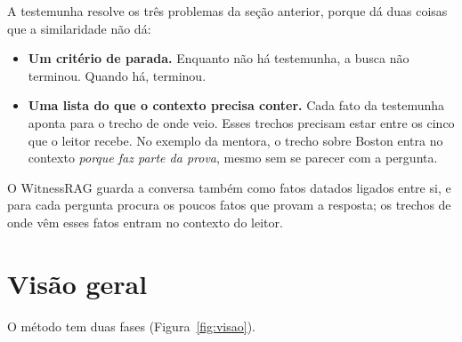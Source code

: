 \documentclass[11pt]{article}
\begin{document}
A testemunha resolve os três problemas da seção anterior, porque dá duas
coisas que a similaridade não dá:
\begin{itemize}
\item \textbf{Um critério de parada.} Enquanto não há testemunha, a busca não
  terminou. Quando há, terminou.
\item \textbf{Uma lista do que o contexto precisa conter.} Cada fato da
  testemunha aponta para o trecho de onde veio. Esses trechos precisam estar
  entre os cinco que o leitor recebe. No exemplo da mentora, o trecho sobre
  Boston entra no contexto \emph{porque faz parte da prova}, mesmo sem se
  parecer com a pergunta.
\end{itemize}

\begin{resumo}
O WitnessRAG guarda a conversa também como fatos datados ligados entre si, e
para cada pergunta procura os poucos fatos que provam a resposta; os trechos
de onde vêm esses fatos entram no contexto do leitor.
\end{resumo}

\section{Visão geral}
\label{sec:visao}

O método tem duas fases (Figura~\ref{fig:visao}).
\end{document}
